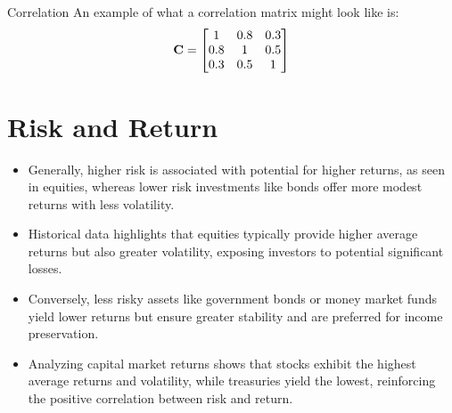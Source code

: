 \begin{sidenotebox}{Correlation}
    An example of what a correlation matrix might look like is:
    \begin{equation}
        \mathbf{C} = \begin{bmatrix}
            1 & 0.8 & 0.3 \\
            0.8 & 1 & 0.5 \\
            0.3 & 0.5 & 1
        \end{bmatrix}
    \end{equation}

\end{sidenotebox}

\section{Risk and Return}
\begin{itemize}
    \item Generally, higher risk is associated with potential for higher returns, as seen in equities, whereas lower risk investments like bonds offer more modest returns with less volatility.
    \item Historical data highlights that equities typically provide higher average returns but also greater volatility, exposing investors to potential significant losses.
    \item Conversely, less risky assets like government bonds or money market funds yield lower returns but ensure greater stability and are preferred for income preservation.
    \item Analyzing capital market returns shows that stocks exhibit the highest average returns and volatility, while treasuries yield the lowest, reinforcing the positive correlation between risk and return.
\end{itemize}

